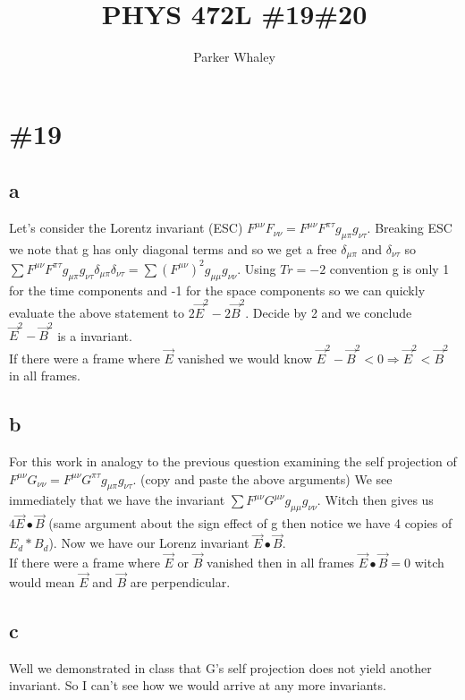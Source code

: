 \documentclass[11pt,a4paper]{article}
\author{Parker Whaley}
\title{PHYS 472L \#19\#20}
\begin{document}
\maketitle
\section{\#19}
\subsection{a}
Let's consider the Lorentz invariant (ESC) $F^{\mu \nu}F_{\nu \nu}=F^{\mu \nu}F^{\pi \tau}g_{\mu \pi}g_{\nu \tau}$.  Breaking ESC we note that g has only diagonal terms and so we get a free $\delta_{\mu \pi}$ and $\delta_{\nu \tau}$ so $\sum F^{\mu \nu}F^{\pi \tau}g_{\mu \pi}g_{\nu \tau}\delta_{\mu \pi}\delta_{\nu \tau}=\sum (F^{\mu \nu})^2g_{\mu \mu}g_{\nu \nu}$.  Using $Tr=-2$ convention g is only 1 for the time components and -1 for the space components so we can quickly evaluate the above statement to $2\vec{E}^2-2\vec{B}^2$.  Decide by 2 and we conclude $\vec{E}^2-\vec{B}^2$ is a invariant.\\

If there were a frame where $\vec{E}$ vanished we would know $\vec{E}^2-\vec{B}^2<0\Rightarrow \vec{E}^2<\vec{B}^2$ in all frames.
\subsection{b}
For this work in analogy to the previous question examining the self projection of $F^{\mu \nu}G_{\nu \nu}=F^{\mu \nu}G^{\pi \tau}g_{\mu \pi}g_{\nu \tau}$.  (copy and paste the above arguments) We see immediately that we have the invariant $\sum F^{\mu \nu}G^{\mu \nu}g_{\mu \mu}g_{\nu \nu}$.  Witch then gives us $4 \vec{E}\bullet\vec{B}$ (same argument about the sign effect of g then notice we have 4 copies of $E_d*B_d$).  Now we have our Lorenz invariant $\vec{E}\bullet\vec{B}$.\\

If there were a frame where $\vec{E}$ or $\vec{B}$ vanished then in all frames $\vec{E}\bullet\vec{B}=0$ witch would mean $\vec{E}$ and $\vec{B}$ are perpendicular.
\subsection{c}
Well we demonstrated in class that G's self projection does not yield another invariant.  So I can't see how we would arrive at any more invariants.
\end{document}
